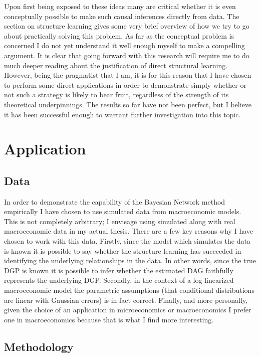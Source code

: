 \documentclass{article}
\begin{document}
Upon first being exposed to these ideas many are critical whether it is even conceptually possible to make such causal inferences directly from data. The section on structure learning gives some very brief overview of how we try to go about practically solving this problem. As far as the conceptual problem is concerned I do not yet understand it well enough myself to make a compelling argument. It is clear that going forward with this research will require me to do much deeper reading about the justification of direct structural learning. However, being the pragmatist that I am, it is for this reason that I have chosen to perform some direct applications in order to demonstrate simply whether or not such a strategy is likely to bear fruit, regardless of the strength of its theoretical underpinnings. The results so far have not been perfect, but I believe it has been successful enough to warrant further investigation into this topic.

\section{Application}

\subsection{Data}

In order to demonstrate the capability of the Bayesian Network method empirically I have chosen to use simulated data from macroeconomic models. This is not completely arbitrary; I envisage using simulated along with real macroeconomic data in my actual thesis. There are a few key reasons why I have chosen to work with this data. Firstly, since the model which simulates the data is known it is possible to say whether the structure learning has succeeded in identifying the underlying relationships in the data. In other words, since the true DGP is known it is possible to infer whether the estimated DAG faithfully represents the underlying DGP. Secondly, in the context of a log-linearized macroeconomic model the parametric assumptions (that conditional distributions are linear with Gaussian errors) is in fact correct. Finally, and more personally, given the choice of an application in microeconomics or macroeconomics I prefer one in macroeconomics because that is what I find more interesting.

\subsection{Methodology}
\end{document}
